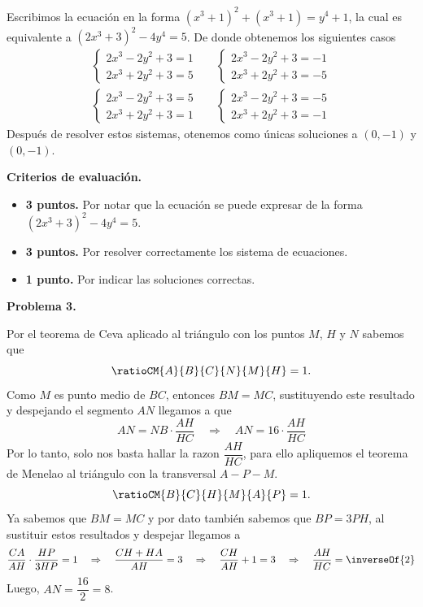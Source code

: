 Escribimos la ecuación en la forma $(x^3 + 1)^2 + (x^3 + 1) = y^4 + 1$, la cual es equivalente a $(2x^3 + 3)^2 - 4y^4 = 5$.
De donde obtenemos los siguientes casos
\begin{align*}
    \begin{cases}
        2x^3 - 2y^2 + 3 = 1\\
        2x^3 + 2y^2 + 3 = 5
    \end{cases}
    &&
    \begin{cases}
        2x^3 - 2y^2 + 3 = -1\\
        2x^3 + 2y^2 + 3 = -5
    \end{cases}\\[2mm]
    \begin{cases}
        2x^3 - 2y^2 + 3 = 5\\
        2x^3 + 2y^2 + 3 = 1
    \end{cases}
    &&
    \begin{cases}
        2x^3 - 2y^2 + 3 = -5\\
        2x^3 + 2y^2 + 3 = -1
    \end{cases}
\end{align*}
Después de resolver estos sistemas, otenemos como únicas soluciones a $(0, -1)$ y $(0, -1)$.

\textbf{Criterios de evaluación.}
\begin{itemize}
    \item \textbf{3 puntos.} Por notar que la ecuación se puede expresar de la forma $(2x^3 + 3)^2 - 4y^4 = 5$.
    \item \textbf{3 puntos.} Por resolver correctamente los sistema de ecuaciones.
    \item \textbf{1 punto.} Por indicar las soluciones correctas.
\end{itemize}


\newpage
\textbf{Problema 3.}
\begin{figure}[H]
    \centering
    
\end{figure}

Por el teorema de Ceva aplicado al triángulo  con los puntos $M$, $H$ y $N$ sabemos que
\[
    \ratioCM{A}{B}{C}{N}{M}{H} = 1.
\]
Como $M$ es punto medio de $BC$, entonces $BM = MC$, sustituyendo este resultado y despejando el segmento $AN$ llegamos a que
\[
    AN = NB \cdot \frac{AH}{HC} \quad \Rightarrow \quad  AN = 16 \cdot \frac{AH}{HC}
\]
Por lo tanto, solo nos basta hallar la razon $\dfrac{AH}{HC}$, para ello apliquemos el teorema de Menelao al triángulo  con la transversal $A - P - M$.
\[
    \ratioCM{B}{C}{H}{M}{A}{P} = 1.
\]
Ya sabemos que $BM = MC$ y por dato también sabemos que $BP = 3 PH$, al sustituir estos resultados y despejar llegamos a
\[
    \frac{CA}{AH} \cdot \frac{HP}{3HP} = 1 \quad \Rightarrow \quad  \frac{CH + HA}{AH} = 3  \quad \Rightarrow \quad  \frac{CH}{AH} + 1 = 3 \quad \Rightarrow \quad \frac{AH}{HC} = \inverseOf{2}
\]
Luego, $AN = \dfrac{16}{2} = 8$.



